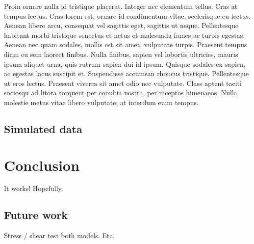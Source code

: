 \documentclass[aps,pre,twocolumn,letterpaper,floatfix,showpacs]{revtex4}
\begin{document}
Proin ornare nulla id tristique placerat. Integer nec elementum tellus. Cras at tempus lectus. Cras lorem est, ornare id condimentum vitae, scelerisque eu lectus. Aenean libero arcu, consequat vel sagittis eget, sagittis ut neque. Pellentesque habitant morbi tristique senectus et netus et malesuada fames ac turpis egestas. Aenean nec quam sodales, mollis est sit amet, vulputate turpis. Praesent tempus diam eu sem laoreet finibus. Nulla finibus, sapien vel lobortis ultricies, mauris ipsum aliquet urna, quis rutrum sapien dui id ipsum. Quisque sodales ex sapien, ac egestas lacus suscipit et. Suspendisse accumsan rhoncus tristique. Pellentesque ut eros lectus. Praesent viverra sit amet odio nec vulputate. Class aptent taciti sociosqu ad litora torquent per conubia nostra, per inceptos himenaeos. Nulla molestie metus vitae libero vulputate, at interdum enim tempus.
\subsection{Simulated data}


\section{Conclusion}
It works! Hopefully.
\subsection{Future work}
Stress / shear test both models. Etc.







\end{document}
